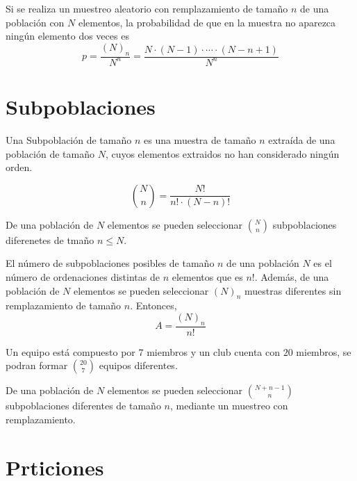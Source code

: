 \begin{theo}
  Si se realiza un muestreo aleatorio con remplazamiento de tamaño $n$ de una población con $N$ elementos, la probabilidad de que en la muestra no aparezca ningún elemento dos veces es 
  \[ 
    p = \frac{(N)_{n}}{N^{n}} = \frac{N \cdot (N -1) \cdot \cdots \cdot (N-n+1)}{N^{n}} 
  \] 
\end{theo}

\section{Subpoblaciones}

\begin{defn}[Subpoblación]
  Una Subpoblación de tamaño $n$ es  una muestra de tamaño $n$ extraída de una población de tamaño $N$, cuyos elementos extraidos no han considerado ningún orden.
\end{defn}

\begin{nota}
  \[
    \binom{N}{n} = \frac{N!}{n! \cdot (N-n)!}
  \]
\end{nota}

\begin{theo}
  De una población de $N$ elementos se pueden seleccionar $\binom{N}{n}$ subpoblaciones diferenetes de tmaño $n \leq N$.
\end{theo}

\begin{dem}
  El número de subpoblaciones posibles de tamaño $n$ de una población $N$ es el número de ordenaciones distintas de $n$ elementos que es $n!$. Además, de una población de $N$ elementos se pueden seleccionar $(N)_{n}$ muestras diferentes sin remplazamiento de tamaño $n$. Entonces,
  \[ 
    A = \frac{(N)_{n}}{n!}
  \] 
\end{dem}

\begin{ejm}
  Un equipo está compuesto por $7$ miembros y un club cuenta con $20$ miembros, se podran formar $\binom{20}{7}$ equipos diferentes.
\end{ejm}

\begin{theo}
  De una población de $N$ elementos se pueden seleccionar $\binom{N + n -1}{n}$ subpoblaciones diferentes de tamaño $n$, mediante un muestreo con remplazamiento.
\end{theo}

\section{Prticiones}

